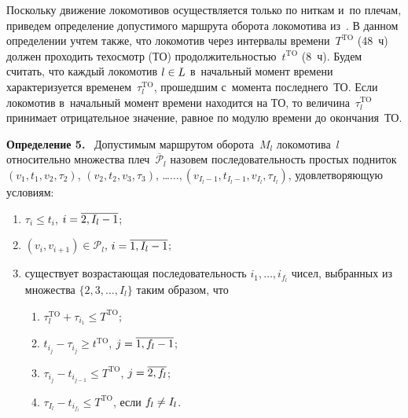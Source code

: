 \begin{multicols}{2}
Поскольку движение локомотивов осуществляется только по ниткам и~по плечам, 
приведем определение допустимого маршрута оборота локомотива из~\cite{AzanovBuyanov}.
В данном определении учтем также, что локомотив через интервалы времени~$T^{\mathrm{TO}}$ 
(48~ч) должен проходить техосмотр (ТО) продолжительностью~$t^{\mathrm{TO}}$ (8~ч). 
Будем считать, что каждый локомотив $l\hm\in L$ в~начальный момент времени 
характеризуется временем~$\tau_l^{\mathrm{TO}}$, прошедшим с~момента последнего~ТО.
Если локомотив в~начальный момент времени находится на ТО, 
то величина~$\tau_l^{\mathrm{TO}}$ принимает отрицательное значение, равное по модулю 
времени до окончания~ТО.

\smallskip

\noindent
\textbf{Определение 5.}\ %
    Допустимым маршрутом оборота~$M_l$  локомотива~$l$ относительно множества 
    плеч~$\overline {\mathcal P}_l$ назовем последовательность прос\-тых 
    подниток $(v_1, t_1, v_2, \tau_2)$,  $(v_2, t_2, v_3, \tau_3)$, 
    \ldots\linebreak $\ldots , (v_{I_l-1}, t_{I_l-1}, v_{I_l}, \tau_{I_l})$, удовлетворяющую условиям:
\begin{enumerate}[(1)]
\item $\tau_{i} \leqslant t_{i}$, $i \hm= \overline{2,I_l -1}$;

\item $(v_i,v_{i+1}) \in\mathcal {P}_l $,  $i \hm= \overline{1,I_l -1}$;

\item существует возрастающая последовательность $i_1, \ldots, i_{f_l}$ 
чисел, выбранных из множества $\{2,3,\ldots,I_l\}$ таким образом, что
\begin{enumerate}[({3}.1)]
\item $\tau^{\mathrm{TO}}_l + \tau_{i_1} \leqslant T^{\mathrm{TO}}$;
    
     \item $t_{i_j}-\tau_{i_j} \geqslant t^{\mathrm{TO}}$, $j\hm=\overline{1, f_l-1}$;
    
        \item $\tau_{i_j} - t_{i_{j-1}} \leqslant T^{\mathrm{TO}}$, $j\hm=\overline{2, f_l}$;
    
        \item $\tau_{I_l} - t_{i_{f_l}} \leqslant T^{\mathrm{TO}}$, если $f_l\hm\ne I_l$.
        
\end{enumerate}
\end{enumerate}


\end{multicols}
